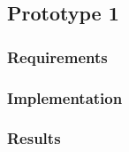 \subsection{Prototype 1}
\subsubsection{Requirements}
\subsubsection{Implementation}
\subsubsection{Results}


